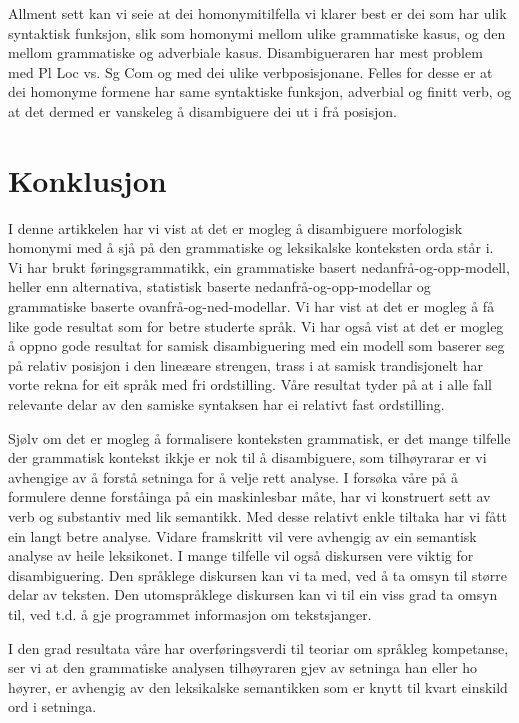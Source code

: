 \documentclass[a4paper,norsk]{article}
\begin{document}
Allment sett kan vi seie at dei homonymitilfella vi klarer best er dei som har ulik syntaktisk funksjon, slik som homonymi mellom ulike grammatiske kasus, og den mellom grammatiske og adverbiale kasus. Disambigueraren har mest problem med Pl Loc vs. Sg Com og med dei ulike verbposisjonane. Felles for desse er at dei homonyme formene har same syntaktiske funksjon, adverbial og finitt verb, og at det dermed er vanskeleg å disambiguere dei ut i frå posisjon.

\section{Konklusjon}

I denne artikkelen har vi vist at det er mogleg å disambiguere morfologisk homonymi med å sjå på den grammatiske og leksikalske konteksten orda står i. Vi har brukt føringsgrammatikk, ein grammatiske basert nedanfrå-og-opp-modell, heller enn alternativa, statistisk baserte nedanfrå-og-opp-modellar og grammatiske baserte ovanfrå-og-ned-modellar. Vi har vist at det er mogleg å få like gode resultat som for betre studerte språk. Vi har også vist at det er mogleg å oppno gode resultat for samisk disambiguering med ein modell som baserer seg på relativ posisjon i den lineæare strengen, trass i at samisk trandisjonelt har vorte rekna for eit språk med fri ordstilling. Våre resultat tyder på at i alle fall relevante delar av den samiske syntaksen har ei relativt fast ordstilling.  %

Sjølv om det er mogleg å formalisere konteksten grammatisk, er det mange tilfelle der grammatisk kontekst ikkje er nok til å disambiguere, som tilhøyrarar er vi avhengige av å forstå setninga for å velje rett analyse. I forsøka våre på å formulere denne forståinga på ein maskinlesbar måte, har vi konstruert sett av verb og substantiv med lik semantikk. Med desse relativt enkle tiltaka har vi fått ein langt betre analyse. Vidare framskritt vil vere avhengig av ein semantisk analyse av heile leksikonet. I mange tilfelle vil også diskursen vere viktig for disambiguering. Den språklege diskursen kan vi ta med, ved å ta omsyn til større delar av teksten. Den utomspråklege diskursen kan vi til ein viss grad ta omsyn til, ved t.d. å gje programmet informasjon om tekstsjanger. %

I den grad resultata våre har overføringsverdi til teoriar om språkleg kompetanse, ser vi at den grammatiske analysen tilhøyraren gjev av setninga han eller ho høyrer, er avhengig av den leksikalske semantikken som er knytt til kvart einskild ord i setninga. %





\end{document}
